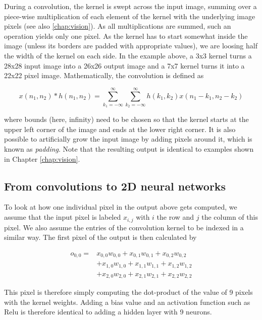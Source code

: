 During a convolution, the kernel is swept across the input image, summing over a piece-wise multiplication of each element of the kernel with the underlying image pixels (see also \cref{chap:vision}). As all multiplications are summed, such an operation yields only one pixel. As the kernel has to start somewhat inside the image (unless its borders are padded with appropriate values), we are loosing half the width of the kernel on each side. In the example above, a 3x3 kernel turns a 28x28 input image into a 26x26 output image and a 7x7 kernel turns it into a 22x22 pixel image. Mathematically, the convolution is defined as

\begin{equation}
x(n_1,n_2)*h(n_1,n_2)=\sum_{k_1=-\infty}^{\infty} \sum_{k_2=-\infty}^{\infty} h(k_1,k_2)x(n_1-k_1,n_2-k_2)
\end{equation}

where bounds (here, infinity) need to be chosen so that the kernel starts at the upper left corner of the image and ends at the lower right corner. It is also possible to artificially grow the input image by adding pixels around it, which is known as \emph{padding}. Note that the resulting output is identical to examples shown in Chapter \ref{chap:vision}.

\subsection{From convolutions to 2D neural networks}

To look at how one individual pixel in the output above gets computed, we assume that the input pixel is labeled $x_{i,j}$ with $i$ the row and $j$ the column of this pixel. We also assume the entries of the convolution kernel to be indexed in a similar way. The first pixel of the output is then calculated by

\begin{eqnarray}
o_{0,0}=&x_{0,0}w_{0,0}+x_{0,1}w_{0,1}+x_{0,2}w_{0,2}\\
\nonumber
		&+x_{1,0}w_{1,0}+x_{1,1}w_{1,1}+x_{1,2}w_{1,2}\\
\nonumber
		&+x_{2,0}w_{2,0}+x_{2,1}w_{2,1}+x_{2,2}w_{2,2}
\end{eqnarray}

This pixel is therefore simply computing the dot-product of the value of 9 pixels with the kernel weights. Adding a bias value and an activation function such as Relu is therefore identical to adding a hidden layer with 9 neurons. 

